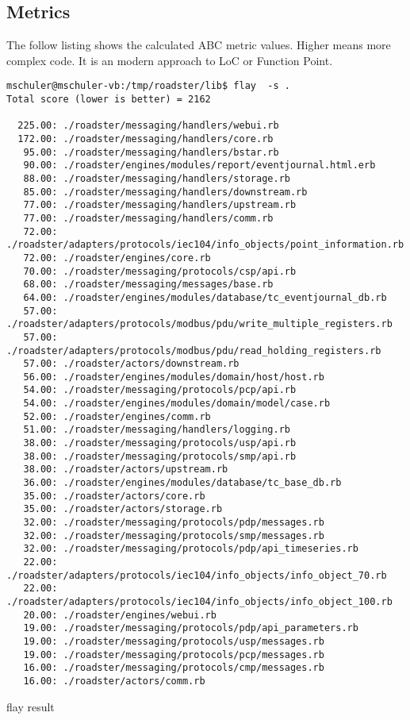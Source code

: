 \subsection{Metrics}
The follow listing shows the calculated ABC metric values. Higher means more complex code. It is an modern approach to LoC or Function Point.
\begin{listing}[H]
	\begin{verbatim}
mschuler@mschuler-vb:/tmp/roadster/lib$ flay  -s .
Total score (lower is better) = 2162

  225.00: ./roadster/messaging/handlers/webui.rb
  172.00: ./roadster/messaging/handlers/core.rb
   95.00: ./roadster/messaging/handlers/bstar.rb
   90.00: ./roadster/engines/modules/report/eventjournal.html.erb
   88.00: ./roadster/messaging/handlers/storage.rb
   85.00: ./roadster/messaging/handlers/downstream.rb
   77.00: ./roadster/messaging/handlers/upstream.rb
   77.00: ./roadster/messaging/handlers/comm.rb
   72.00: ./roadster/adapters/protocols/iec104/info_objects/point_information.rb
   72.00: ./roadster/engines/core.rb
   70.00: ./roadster/messaging/protocols/csp/api.rb
   68.00: ./roadster/messaging/messages/base.rb
   64.00: ./roadster/engines/modules/database/tc_eventjournal_db.rb
   57.00: ./roadster/adapters/protocols/modbus/pdu/write_multiple_registers.rb
   57.00: ./roadster/adapters/protocols/modbus/pdu/read_holding_registers.rb
   57.00: ./roadster/actors/downstream.rb
   56.00: ./roadster/engines/modules/domain/host/host.rb
   54.00: ./roadster/messaging/protocols/pcp/api.rb
   54.00: ./roadster/engines/modules/domain/model/case.rb
   52.00: ./roadster/engines/comm.rb
   51.00: ./roadster/messaging/handlers/logging.rb
   38.00: ./roadster/messaging/protocols/usp/api.rb
   38.00: ./roadster/messaging/protocols/smp/api.rb
   38.00: ./roadster/actors/upstream.rb
   36.00: ./roadster/engines/modules/database/tc_base_db.rb
   35.00: ./roadster/actors/core.rb
   35.00: ./roadster/actors/storage.rb
   32.00: ./roadster/messaging/protocols/pdp/messages.rb
   32.00: ./roadster/messaging/protocols/smp/messages.rb
   32.00: ./roadster/messaging/protocols/pdp/api_timeseries.rb
   22.00: ./roadster/adapters/protocols/iec104/info_objects/info_object_70.rb
   22.00: ./roadster/adapters/protocols/iec104/info_objects/info_object_100.rb
   20.00: ./roadster/engines/webui.rb
   19.00: ./roadster/messaging/protocols/pdp/api_parameters.rb
   19.00: ./roadster/messaging/protocols/usp/messages.rb
   19.00: ./roadster/messaging/protocols/pcp/messages.rb
   16.00: ./roadster/messaging/protocols/cmp/messages.rb
   16.00: ./roadster/actors/comm.rb
	\end{verbatim}
	\caption{flay result}
	\label{lst:metrics:flay:result}
\end{listing}

